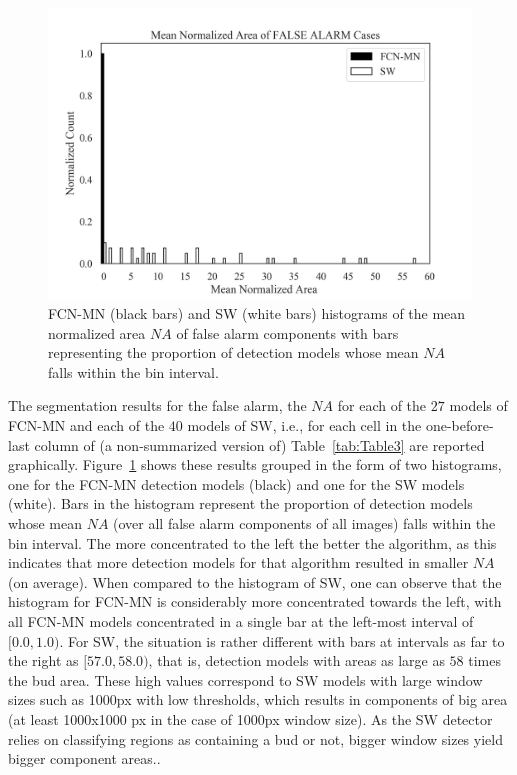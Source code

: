 \documentclass[a4paper,authoryear,review]{elsarticle}
\begin{document}
	
	
	\begin{figure}%
		\centering
		\includegraphics[width=\textwidth]{figures/Figure6.png}%
		\caption{
			FCN-MN (black bars) and SW (white bars) histograms of the mean normalized area $NA$ of false alarm components with bars representing the proportion of detection models whose mean $NA$ falls within the bin interval.
		}
		\label{fig:Figure6}
	\end{figure}
	
	
	The segmentation results for the false alarm, the $NA$  for each of the $27$ models of FCN-MN and each of the $40$ models of SW, i.e., for each cell in the  one-before-last column of (a non-summarized version of) Table~\ref{tab:Table3} are reported graphically. Figure~\ref{fig:Figure6} shows these results grouped in the form of two histograms, one for the FCN-MN detection models (black) and one for the SW models  (white). Bars in the histogram represent the proportion of detection models whose mean $NA$ (over all false alarm components of all images) falls within the bin interval. The more concentrated to the left the better the algorithm, as this indicates that more detection models for that algorithm resulted in smaller $NA$ (on average). When compared to the histogram of SW, one can observe that the histogram for FCN-MN is considerably more concentrated towards the left, with all FCN-MN models concentrated in a single bar at the left-most interval of $[0.0, 1.0)$. For SW, the situation is rather different with bars at intervals as far to the right as $[57.0, 58.0)$, that is, detection models with areas as large as $58$ times the bud area. These high values correspond to SW models with large window sizes such as 1000px with low thresholds, which results in components of big area (at least 1000x1000 px in the case of 1000px window size). As the SW detector relies on classifying regions as containing a bud or not, bigger window sizes yield bigger component areas..
	
\end{document}
